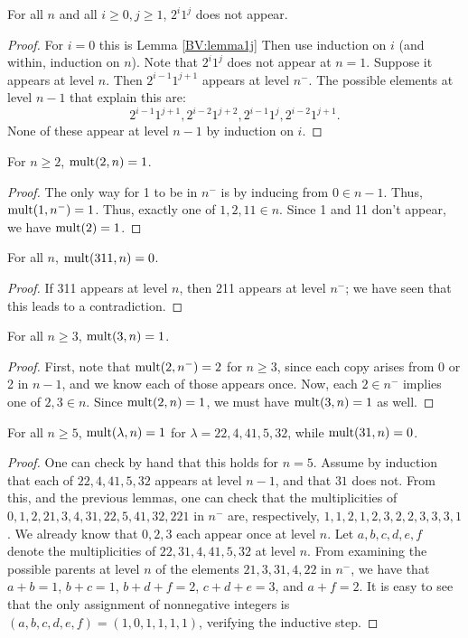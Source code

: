 \begin{lemma}
For all $n$ and all $i\ge 0, j \ge 1$, $2^i1^j$ does not appear.
\end{lemma}
\begin{proof}
For $i=0$ this is Lemma \ref{BV:lemma1j}
Then use induction on $i$ (and within, induction on $n$).
Note that $2^i1^j$ does not appear at $n=1$.
Suppose it appears at level $n$.
Then $2^{i-1}1^{j+1}$ appears at level $n^-$.
The possible elements at level $n-1$ that explain this are:
$$
2^{i-1}1^{j+1},
2^{i-2}1^{j+2},
2^{i-1}1^{j},
2^{i-2}1^{j+1}.
$$
None of these appear at level $n-1$ by induction on $i$.
\end{proof}

\begin{lemma}
For $n \ge 2$, $\textup{mult}(2,n) = 1$.
\end{lemma}
\begin{proof}
The only way for 1 to be in $n^-$ is by inducing from $0 \in n-1$. Thus, $\textup{mult}(1,n^-)=1$. Thus, exactly one of $1,2,11 \in n$. Since 1 and 11 don't appear, we have $\textup{mult}(2)=1$.
\end{proof}

\begin{lemma}
For all $n$, $\textup{mult}(311,n)=0$.
\end{lemma}
\begin{proof}
If 311 appears at level $n$, then 211 appears at level $n^-$; we have seen that this leads to a contradiction.
\end{proof}

\begin{lemma}
For all $n \ge 3$, $\textup{mult}(3,n) = 1$.
\end{lemma}
\begin{proof}
First, note that $\textup{mult}(2,n^-)=2$ for $n \ge 3$, since each copy arises from 0 or 2 in $n-1$, and we know each of those appears once.
Now, each $2 \in n^-$ implies one of $2,3 \in n$. Since $\textup{mult}(2,n)=1$, we must have $\textup{mult}(3,n)=1$ as well.
\end{proof}

\begin{lemma}\label{BV:biglemma}
For all $n \ge 5$, $\textup{mult}(\lambda,n)=1$ for $\lambda = 22,4,41,5,32$, while $\textup{mult}(31,n)=0$.
\end{lemma}
\begin{proof}
One can check by hand that this holds for $n=5$.
Assume by induction that each of $22,4,41,5,32$ appears at level $n-1$, and that $31$ does not.
From this, and the previous lemmas, one can check that the multiplicities of $0,1,2,21,3,4,31,22,5,41,32,221$ in $n^-$ are, respectively, $1,1,2,1,2,3,2,2,3,3,3,1$. We already know that $0,2,3$ each appear once at level $n$. Let $a,b,c,d,e,f$ denote the multiplicities of $22,31,4,41,5,32$ at level $n$. From examining the possible parents at level $n$ of the elements $21,3,31,4,22$ in $n^-$, we have that $a+b=1$, $b+c=1$, $b+d+f=2$, $c+d+e=3$, and $a+f=2$. It is easy to see that the only assignment of nonnegative integers is $(a,b,c,d,e,f) = (1,0,1,1,1,1)$, verifying the inductive step.
\end{proof}

